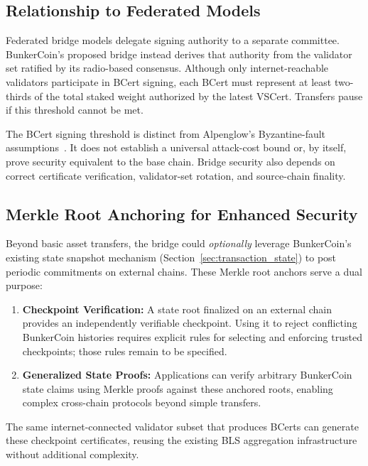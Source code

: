 \documentclass{article}
\begin{document}
\subsection{Relationship to Federated Models}
Federated bridge models delegate signing authority to a separate committee. BunkerCoin's proposed bridge instead derives that authority from the validator set ratified by its radio-based consensus. Although only internet-reachable validators participate in BCert signing, each BCert must represent at least two-thirds of the total staked weight authorized by the latest VSCert. Transfers pause if this threshold cannot be met.

The BCert signing threshold is distinct from Alpenglow's Byzantine-fault assumptions~\cite{alpenglow}. It does not establish a universal attack-cost bound or, by itself, prove security equivalent to the base chain. Bridge security also depends on correct certificate verification, validator-set rotation, and source-chain finality.

\subsection{Merkle Root Anchoring for Enhanced Security}
Beyond basic asset transfers, the bridge could \emph{optionally} leverage BunkerCoin's existing state snapshot mechanism (Section~\ref{sec:transaction_state}) to post periodic commitments on external chains. These Merkle root anchors serve a dual purpose:

\begin{enumerate}
    \item \textbf{Checkpoint Verification:} A state root finalized on an external chain provides an independently verifiable checkpoint. Using it to reject conflicting BunkerCoin histories requires explicit rules for selecting and enforcing trusted checkpoints; those rules remain to be specified.
    \item \textbf{Generalized State Proofs:} Applications can verify arbitrary BunkerCoin state claims using Merkle proofs against these anchored roots, enabling complex cross-chain protocols beyond simple transfers.
\end{enumerate}

The same internet-connected validator subset that produces BCerts can generate these checkpoint certificates, reusing the existing BLS aggregation infrastructure without additional complexity.

\end{document}
